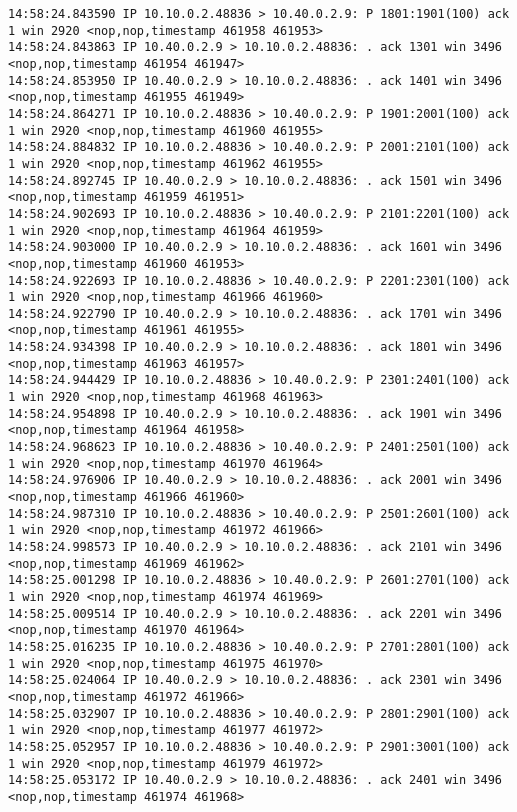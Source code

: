 \documentclass[a4paper,12pt]{article}
\begin{document}
\begin{lstlisting}
14:58:24.843590 IP 10.10.0.2.48836 > 10.40.0.2.9: P 1801:1901(100) ack 1 win 2920 <nop,nop,timestamp 461958 461953>
14:58:24.843863 IP 10.40.0.2.9 > 10.10.0.2.48836: . ack 1301 win 3496 <nop,nop,timestamp 461954 461947>
14:58:24.853950 IP 10.40.0.2.9 > 10.10.0.2.48836: . ack 1401 win 3496 <nop,nop,timestamp 461955 461949>
14:58:24.864271 IP 10.10.0.2.48836 > 10.40.0.2.9: P 1901:2001(100) ack 1 win 2920 <nop,nop,timestamp 461960 461955>
14:58:24.884832 IP 10.10.0.2.48836 > 10.40.0.2.9: P 2001:2101(100) ack 1 win 2920 <nop,nop,timestamp 461962 461955>
14:58:24.892745 IP 10.40.0.2.9 > 10.10.0.2.48836: . ack 1501 win 3496 <nop,nop,timestamp 461959 461951>
14:58:24.902693 IP 10.10.0.2.48836 > 10.40.0.2.9: P 2101:2201(100) ack 1 win 2920 <nop,nop,timestamp 461964 461959>
14:58:24.903000 IP 10.40.0.2.9 > 10.10.0.2.48836: . ack 1601 win 3496 <nop,nop,timestamp 461960 461953>
14:58:24.922693 IP 10.10.0.2.48836 > 10.40.0.2.9: P 2201:2301(100) ack 1 win 2920 <nop,nop,timestamp 461966 461960>
14:58:24.922790 IP 10.40.0.2.9 > 10.10.0.2.48836: . ack 1701 win 3496 <nop,nop,timestamp 461961 461955>
14:58:24.934398 IP 10.40.0.2.9 > 10.10.0.2.48836: . ack 1801 win 3496 <nop,nop,timestamp 461963 461957>
14:58:24.944429 IP 10.10.0.2.48836 > 10.40.0.2.9: P 2301:2401(100) ack 1 win 2920 <nop,nop,timestamp 461968 461963>
14:58:24.954898 IP 10.40.0.2.9 > 10.10.0.2.48836: . ack 1901 win 3496 <nop,nop,timestamp 461964 461958>
14:58:24.968623 IP 10.10.0.2.48836 > 10.40.0.2.9: P 2401:2501(100) ack 1 win 2920 <nop,nop,timestamp 461970 461964>
14:58:24.976906 IP 10.40.0.2.9 > 10.10.0.2.48836: . ack 2001 win 3496 <nop,nop,timestamp 461966 461960>
14:58:24.987310 IP 10.10.0.2.48836 > 10.40.0.2.9: P 2501:2601(100) ack 1 win 2920 <nop,nop,timestamp 461972 461966>
14:58:24.998573 IP 10.40.0.2.9 > 10.10.0.2.48836: . ack 2101 win 3496 <nop,nop,timestamp 461969 461962>
14:58:25.001298 IP 10.10.0.2.48836 > 10.40.0.2.9: P 2601:2701(100) ack 1 win 2920 <nop,nop,timestamp 461974 461969>
14:58:25.009514 IP 10.40.0.2.9 > 10.10.0.2.48836: . ack 2201 win 3496 <nop,nop,timestamp 461970 461964>
14:58:25.016235 IP 10.10.0.2.48836 > 10.40.0.2.9: P 2701:2801(100) ack 1 win 2920 <nop,nop,timestamp 461975 461970>
14:58:25.024064 IP 10.40.0.2.9 > 10.10.0.2.48836: . ack 2301 win 3496 <nop,nop,timestamp 461972 461966>
14:58:25.032907 IP 10.10.0.2.48836 > 10.40.0.2.9: P 2801:2901(100) ack 1 win 2920 <nop,nop,timestamp 461977 461972>
14:58:25.052957 IP 10.10.0.2.48836 > 10.40.0.2.9: P 2901:3001(100) ack 1 win 2920 <nop,nop,timestamp 461979 461972>
14:58:25.053172 IP 10.40.0.2.9 > 10.10.0.2.48836: . ack 2401 win 3496 <nop,nop,timestamp 461974 461968>

\end{lstlisting}
\end{document}
